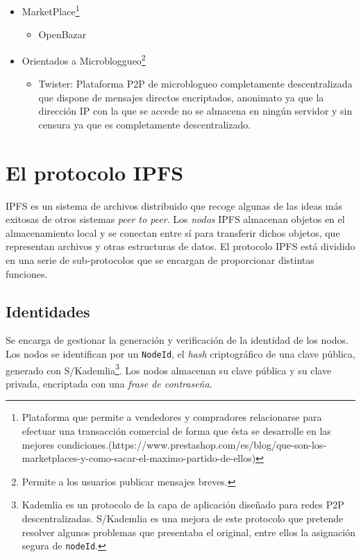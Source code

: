 \documentclass[12pt]{article} %
\begin{document}
\begin{itemize}
\begin{itemize}
    \end{itemize}
   \item MarketPlace\footnote{Plataforma que permite a vendedores y compradores relacionarse para efectuar una transacción comercial de forma que ésta se desarrolle en las mejores condiciones.(https://www.prestashop.com/es/blog/que-son-los-marketplaces-y-como-sacar-el-maximo-partido-de-ellos)}
    \begin{itemize}      
      \item  OpenBazar
    \end{itemize}
   	\item Orientados a Microbloggueo\footnote{Permite a los usuarios publicar mensajes breves.}
   	\begin{itemize}
    	\item Twister: Plataforma P2P de microblogueo completamente descentralizada que dispone de mensajes directos encriptados, anonimato ya que la dirección IP con la que se accede no se almacena en ningún servidor y sin censura ya que es completamente descentralizado.
    \end{itemize} 
\end{itemize}



\section{El protocolo IPFS} %
\label{sec:el_protocolo_ipfs}

IPFS es un sistema de archivos distribuido que recoge algunas de las ideas más exitosas de otros sistemas \textit{peer to peer}. Los \textit{nodos} IPFS almacenan objetos en el almacenamiento local y se conectan entre sí para transferir dichos objetos, que representan archivos y otras estructuras de datos. El protocolo IPFS está dividido en una serie de sub-protocolos que se encargan de proporcionar distintas funciones.

\subsection{Identidades} %
\label{sub:identidades}

Se encarga de gestionar la generación y verificación de la identidad de los nodos. Los nodos se identifican por un \texttt{NodeId}, el \textit{hash} criptográfico de una clave pública, generado con S/Kademlia\footnote{Kademlia es un protocolo de la capa de aplicación diseñado para redes P2P descentralizadas. S/Kademlia es una mejora de este protocolo que pretende resolver algunos problemas que presentaba el original, entre ellos la asignación segura de \texttt{nodeId}.\cite{S/Kamdelia}}. Los nodos almacenan su clave pública y su clave privada, encriptada con una \textit{frase de contraseña}.
\end{document}
